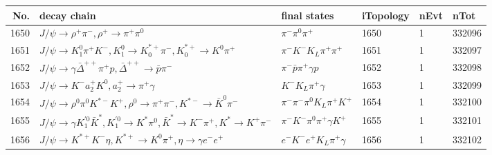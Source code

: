 \begin{table}[htbp] 
\begin{center}
\begin{small}
\begin{tabular}{rlllll}\hline\hline
 No. & decay chain & final states &  iTopology & nEvt & nTot \\\hline
1650&$J/\psi       \rightarrow \rho^{+}      \pi^{-}        , \rho^{+}       \rightarrow \pi^{+}        \pi^{0}        $&$\pi^{-}        \pi^{0}        \pi^{+}        $& 1650&    1&332096\\
1651&$J/\psi       \rightarrow K_1^{0}        \pi^{+}        K^{-}          , K_1^{0}         \rightarrow K_{0}^{*+}     \pi^{-}        , K_{0}^{*+}      \rightarrow K^{0}          \pi^{+}        $&$\pi^{-}        K^{-}          K_{L}          \pi^{+}        \pi^{+}        $& 1651&    1&332097\\
1652&$J/\psi       \rightarrow \gamma       \bar{\Delta}^{++}\pi^{+}        p                 , \bar{\Delta}^{++} \rightarrow \bar{p}          \pi^{-}        $&$\pi^{-}        \bar{p}          \pi^{+}        \gamma       p                 $& 1652&    1&332098\\
1653&$J/\psi       \rightarrow K^{-}          a_{2}^{+}      K^{0}          , a_{2}^{+}       \rightarrow \pi^{+}        \gamma       $&$K^{-}          K_{L}          \pi^{+}        \gamma       $& 1653&    1&332099\\
1654&$J/\psi       \rightarrow \rho^{0}      \pi^{0}        K^{*-}         K^{+}          , \rho^{0}       \rightarrow \pi^{+}        \pi^{-}        , K^{*-}          \rightarrow \bar{K}^{0}   \pi^{-}        $&$\pi^{-}        \pi^{-}        \pi^{0}        K_{L}          \pi^{+}        K^{+}          $& 1654&    1&332100\\
1655&$J/\psi       \rightarrow \gamma       K_1^{'0}      \bar{K}^{*}   , K_1^{'0}       \rightarrow K^{*}          \pi^{0}        , \bar{K}^{*}    \rightarrow K^{-}          \pi^{+}        , K^{*}           \rightarrow K^{+}          \pi^{-}        $&$\pi^{-}        K^{-}          \pi^{0}        \pi^{+}        \gamma       K^{+}          $& 1655&    1&332101\\
1656&$J/\psi       \rightarrow K^{*+}         K^{-}          \eta          , K^{*+}          \rightarrow K^{0}          \pi^{+}        , \eta           \rightarrow \gamma       e^{-}        e^{+}        $&$e^{-}        K^{-}          e^{+}        K_{L}          \pi^{+}        \gamma       $& 1656&    1&332102\\

\end{tabular}
\end{small}
\end{center}
\end{table}
